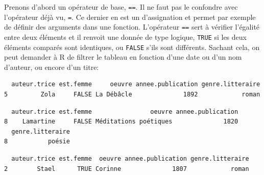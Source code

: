 \documentclass[
  letterpaper,
  DIV=11,
  numbers=noendperiod]{scrartcl}
\newenvironment{Shaded}{\begin{snugshade}}{\end{snugshade}}
\newcommand{\DecValTok}[1]{\textcolor[rgb]{0.68,0.00,0.00}{#1}}
\newcommand{\NormalTok}[1]{\textcolor[rgb]{0.00,0.23,0.31}{#1}}
\newcommand{\SpecialCharTok}[1]{\textcolor[rgb]{0.37,0.37,0.37}{#1}}
\newcommand{\StringTok}[1]{\textcolor[rgb]{0.13,0.47,0.30}{#1}}
\begin{document}
Prenons d'abord un opérateur de base, \texttt{==}. Il ne faut pas le
confondre avec l'opérateur déjà vu, \texttt{=}. Ce dernier en est un
d'assignation et permet par exemple de définir des arguments dans une
fonction. L'opérateur \texttt{==} sert à vérifier l'égalité entre deux
éléments et il renvoit une donnée de type logique, \texttt{TRUE} si les
deux éléments comparés sont identiques, ou \texttt{FALSE} s'ils sont
différents. Sachant cela, on peut demander à R de filtrer le tableau en
fonction d'une date ou d'un nom d'auteur, ou encore d'un titre:

\begin{Shaded}
\end{Shaded}

\begin{verbatim}
  auteur.trice est.femme     oeuvre annee.publication genre.litteraire
5         Zola     FALSE La Débâcle              1892            roman
\end{verbatim}

\begin{Shaded}
\end{Shaded}

\begin{verbatim}
  auteur.trice est.femme                oeuvre annee.publication
8    Lamartine     FALSE Méditations poétiques              1820
  genre.litteraire
8           poésie
\end{verbatim}

\begin{Shaded}
\end{Shaded}

\begin{verbatim}
  auteur.trice est.femme  oeuvre annee.publication genre.litteraire
2        Stael      TRUE Corinne              1807            roman
\end{verbatim}
\end{document}
